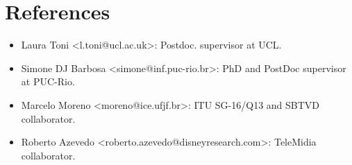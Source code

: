 \documentclass[10pt,a4paper,sans,colorlinks]{moderncv}
\begin{document}
\section{References}

\begin{itemize}[nosep]
  \item Laura Toni <l.toni@ucl.ac.uk>: Postdoc. supervisor at UCL.
  \item Simone DJ Barbosa <simone@inf.puc-rio.br>: PhD and PostDoc supervisor at PUC-Rio.
  \item Marcelo Moreno <moreno@ice.ufjf.br>: ITU SG-16/Q13 and SBTVD collaborator.
  \item Roberto Azevedo <roberto.azevedo@disneyresearch.com>: TeleMidia collaborator.
\end{itemize}
\end{document}
